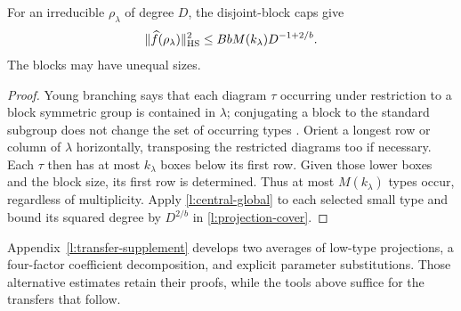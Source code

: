 \begin{proposition}\label{l:branching-hs}
For an irreducible $\rho_\lambda$ of degree $D$, the disjoint-block caps give
\[
 \|\widehat f(\rho_\lambda)\|_{\mathrm{HS}}^2\le BbM(k_\lambda)D^{-1+2/b}.
\]
The blocks may have unequal sizes.
\end{proposition}
\begin{proof}
Young branching says that each diagram $\tau$ occurring under restriction to a block symmetric group is contained in $\lambda$; conjugating a block to the standard subgroup does not change the set of occurring types \cite[Theorem~9.2]{James1978}. Orient a longest row or column of $\lambda$ horizontally, transposing the restricted diagrams too if necessary. Each $\tau$ then has at most $k_\lambda$ boxes below its first row. Given those lower boxes and the block size, its first row is determined. Thus at most $M(k_\lambda)$ types occur, regardless of multiplicity. Apply \eqref{l:central-global} to each selected small type and bound its squared degree by $D^{2/b}$ in \eqref{l:projection-cover}.
\end{proof}

Appendix~\ref{l:transfer-supplement} develops two averages of low-type
projections, a four-factor coefficient decomposition, and explicit
parameter substitutions. Those alternative estimates retain their
proofs, while the tools above suffice for the transfers that follow.
